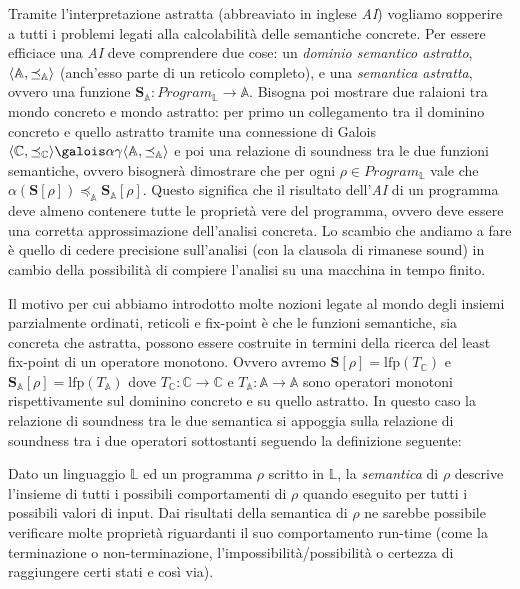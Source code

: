 Tramite l'interpretazione astratta (abbreaviato in inglese \textit{AI}) vogliamo sopperire a tutti i problemi legati alla calcolabilità delle semantiche concrete. Per essere efficiace una \textit{AI} deve comprendere due cose: un \textit{dominio semantico astratto}, \(\langle \mathbb{A}, \preceq_{\mathbb{A}}\rangle\) (anch'esso parte di un reticolo completo), e una \textit{semantica astratta}, ovvero una funzione \(\textbf{S}_{\mathbb{A}}:Program_\mathbb{L}\rightarrow \mathbb{A}\). Bisogna poi mostrare due ralaioni tra mondo concreto e mondo astratto: per primo un collegamento tra il dominino concreto e quello astratto tramite una connessione di Galois \(\GaloisConnection{\mathbb{C}}{\mathbb{A}}\) e poi una relazione di soundness tra le due funzioni semantiche, ovvero bisognerà dimostrare che per ogni \(\rho\in Program_{\mathbb{L}}\) vale che \(\alpha(\textbf{S}[\rho])\preceq_{\mathbb{A}}\textbf{S}_{\mathbb{A}}[\rho]\). Questo significa che il risultato dell'\textit{AI} di un programma deve almeno contenere tutte le proprietà vere del programma, ovvero deve essere una corretta approssimazione dell'analisi concreta. Lo scambio che andiamo a fare è quello di cedere precisione sull'analisi (con la clausola di rimanese sound) in cambio della possibilità di compiere l'analisi su una macchina in tempo finito. 

Il motivo per cui abbiamo introdotto molte nozioni legate al mondo degli insiemi parzialmente ordinati, reticoli e fix-point è che le funzioni semantiche, sia concreta che astratta, possono essere costruite in termini della ricerca del least fix-point di un operatore monotono. Ovvero avremo \(\mathbf{S}[\rho]=\textrm{lfp}(T_{\mathbb{C}})\) e \(\mathbf{S}_{\mathbb{A}}[\rho]=\textrm{lfp}(T_{\mathbb{A}})\) dove \(T_{\mathbb{C}}:\mathbb{C}\rightarrow \mathbb{C}\) e \(T_{\mathbb{A}}:\mathbb{A}\rightarrow \mathbb{A}\) sono operatori monotoni rispettivamente sul dominino concreto e su quello astratto. In questo caso la relazione di soundness tra le due semantica si appoggia sulla relazione di soundness tra i due operatori sottostanti seguendo la definizione seguente:

\iffalse
Dato un linguaggio \(\mathbb{L}\) ed un programma \(\rho\) scritto in \(\mathbb{L}\), la \textit{semantica} di \(\rho\) descrive l'insieme di tutti i possibili comportamenti di \(\rho\) quando eseguito per tutti i possibili valori di input. Dai risultati della semantica di \(\rho\) ne sarebbe possibile verificare molte proprietà riguardanti il suo comportamento run-time (come la terminazione o non-terminazione, l'impossibilità/possibilità o certezza di raggiungere certi stati e così via).

